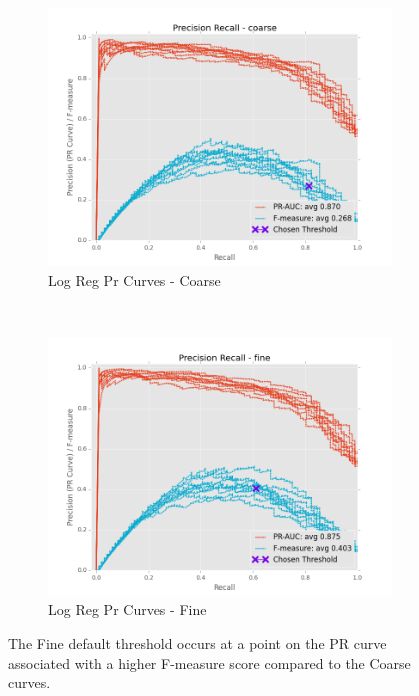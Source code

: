 \documentclass[ms]{nuthesis}
\begin{document}
\FloatBarrier
\begin{figure}[!htb]
    \centering
    \begin{subfigure}[t]{0.5\textwidth}
        \centering
        \includegraphics[width=\textwidth]{fig/LogReg_FindThreshold_PrCurve_coarse}
        \caption{Log Reg Pr Curves - Coarse}
    \end{subfigure}%
    ~
    \begin{subfigure}[t]{0.5\textwidth}
        \centering
        \includegraphics[width=\textwidth]{fig/LogReg_FindThreshold_PrCurve_fine}
        \caption{Log Reg Pr Curves - Fine}
    \end{subfigure}
    \caption{The Fine default threshold occurs at a point on the PR curve associated with a higher
    F-measure score compared to the Coarse curves.}
    \label{fig:LogRegThreshPr}
\end{figure}
\FloatBarrier
\end{document}
